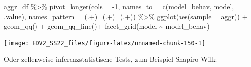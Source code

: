 \documentclass[
]{book}
\newenvironment{Shaded}{\begin{snugshade}}{\end{snugshade}}
\newcommand{\AttributeTok}[1]{\textcolor[rgb]{0.77,0.63,0.00}{#1}}
\newcommand{\DecValTok}[1]{\textcolor[rgb]{0.00,0.00,0.81}{#1}}
\newcommand{\FunctionTok}[1]{\textcolor[rgb]{0.00,0.00,0.00}{#1}}
\newcommand{\NormalTok}[1]{#1}
\newcommand{\OtherTok}[1]{\textcolor[rgb]{0.56,0.35,0.01}{#1}}
\newcommand{\SpecialCharTok}[1]{\textcolor[rgb]{0.00,0.00,0.00}{#1}}
\newcommand{\StringTok}[1]{\textcolor[rgb]{0.31,0.60,0.02}{#1}}
\begin{document}
\begin{Shaded}
\begin{Highlighting}[]
\NormalTok{aggr\_df }\SpecialCharTok{\%\textgreater{}\%} 
  \FunctionTok{pivot\_longer}\NormalTok{(}\AttributeTok{cols =} \SpecialCharTok{{-}}\DecValTok{1}\NormalTok{,}
               \AttributeTok{names\_to =} \FunctionTok{c}\NormalTok{(}\StringTok{\textquotesingle{}model\_behav\textquotesingle{}}\NormalTok{, }\StringTok{\textquotesingle{}model\textquotesingle{}}\NormalTok{, }\StringTok{\textquotesingle{}.value\textquotesingle{}}\NormalTok{),}
               \AttributeTok{names\_pattern =} \StringTok{\textquotesingle{}(.+)\_(.+)\_(.+)\textquotesingle{}}\NormalTok{) }\SpecialCharTok{\%\textgreater{}\%}  
  \FunctionTok{ggplot}\NormalTok{(}\FunctionTok{aes}\NormalTok{(}\AttributeTok{sample =}\NormalTok{ aggr)) }\SpecialCharTok{+}
  \FunctionTok{geom\_qq}\NormalTok{() }\SpecialCharTok{+}
  \FunctionTok{geom\_qq\_line}\NormalTok{()}\SpecialCharTok{+}
  \FunctionTok{facet\_grid}\NormalTok{(model }\SpecialCharTok{\textasciitilde{}}\NormalTok{ model\_behav) }
\end{Highlighting}
\end{Shaded}

\begin{center}\texttt{[image: EDV2\_SS22\_files/figure-latex/unnamed-chunk-150-1]} \end{center}

Oder zellenweise inferenzstatistische Tests, zum Beispiel Shapiro-Wilk:

\begin{Shaded}
\end{Shaded}
\end{document}
